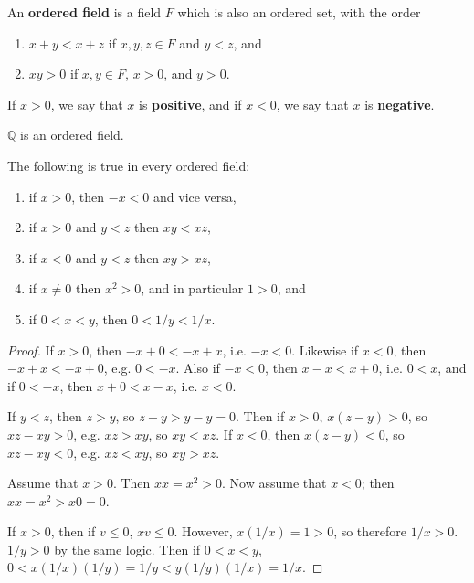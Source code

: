 \documentclass[12pt]{article}
\begin{document}
\begin{defn}
  An \textbf{ordered field} is a field $F$ which is also an ordered set, with the
  order
  \begin{enumerate}
    \item
      $x + y < x + z$ if $x,y,z \in F$ and $y < z$, and
    \item
      $xy > 0$ if $x,y \in F$, $x > 0$, and $y > 0$.
  \end{enumerate}
  If $x > 0$, we say that $x$ is \textbf{positive}, and if $x < 0$, we say that $x$
  is \textbf{negative}.
\end{defn}

\begin{exm}
  $\mathbb{Q}$ is an ordered field.
\end{exm}

\begin{thm}
  The following is true in every ordered field:
  \begin{enumerate}
    \item
      if $x > 0$, then $-x < 0$ and vice versa,
    \item
      if $x > 0$ and $y < z$ then $xy < xz$,
    \item
      if $x < 0$ and $y < z$ then $xy > xz$,
    \item
      if $x \neq 0$ then $x^2 > 0$, and in particular $1 > 0$, and
    \item
      if $0 < x < y$, then $0 < 1/y < 1/x$.
  \end{enumerate}

  \begin{proof}
    If $x > 0$, then $-x + 0 < -x + x$, i.e. $-x < 0$. Likewise if $x < 0$, then $-x
    + x < -x + 0$, e.g. $0 < -x$. Also if $-x < 0$, then $x - x < x + 0$, i.e. $0 <
    x$, and if $0 < -x$, then $x + 0 < x - x$, i.e. $x < 0$.

    If $y < z$, then $z > y$, so $z - y > y - y = 0$. Then if $x > 0$, $x(z - y) >
    0$, so $xz - xy > 0$, e.g. $xz > xy$, so $xy < xz$. If $x < 0$, then $x(z - y) <
    0$, so $xz - xy < 0$, e.g. $xz < xy$, so $xy > xz$.

    Assume that $x > 0$. Then $xx = x^2 > 0$. Now assume that $x < 0$; then $xx = x^2
    > x0 = 0$.

    If $x > 0$, then if $v \leq 0$, $xv \leq 0$. However, $x(1/x) = 1 > 0$, so
    therefore $1/x > 0$. $1/y > 0$ by the same logic. Then if $0 < x < y$, $0 <
    x(1/x)(1/y) = 1/y < y(1/y)(1/x) = 1/x$.
  \end{proof}
\end{thm}
\end{document}
